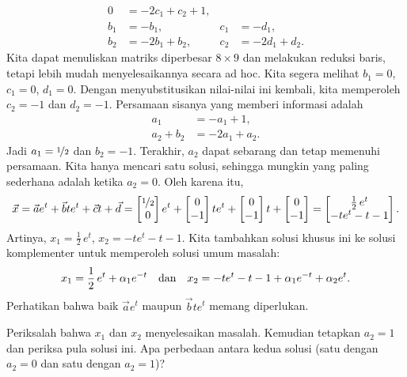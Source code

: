 \begin{example}
\begin{align*}
0 & = -2c_1+c_2 + 1 , \\
b_1 & = -b_1 , &
c_1 & = -d_1 , \\
b_2 & = -2b_1+b_2 , &
c_2 & = -2d_1+d_2 .
\end{align*}
Kita dapat menuliskan matriks diperbesar $8 \times 9$ dan melakukan
reduksi baris, tetapi lebih mudah menyelesaikannya secara ad hoc.
Kita segera melihat $b_1 = 0$, $c_1 = 0$, $d_1 = 0$.  Dengan menyubstitusikan
nilai-nilai ini
kembali, kita memperoleh $c_2 = -1$ dan $d_2 = -1$.  Persamaan sisanya
yang memberi informasi adalah
\begin{align*}
a_1 & = -a_1+1 , \\
a_2+b_2 & = -2a_1+a_2 .
\end{align*}
Jadi $a_1 = \nicefrac{1}{2}$ dan $b_2 = -1$.  Terakhir, $a_2$ dapat sebarang dan tetap memenuhi
persamaan.  Kita hanya mencari satu solusi, sehingga mungkin yang
paling sederhana
adalah ketika $a_2 = 0$.
Oleh karena itu,
\begin{equation*}
\vec{x} = 
\vec{a}
e^{t}
+
\vec{b}
t
e^{t}
+
\vec{c}
t +
\vec{d}
=
\begin{bmatrix}
\nicefrac{1}{2} \\ 0
\end{bmatrix}
e^t
+
\begin{bmatrix}
0 \\ -1
\end{bmatrix}
te^t
+
\begin{bmatrix}
0 \\ -1
\end{bmatrix}
t
+
\begin{bmatrix}
0 \\ -1
\end{bmatrix}
=
\begin{bmatrix}
\frac{1}{2}\,e^t \\
-te^t - t - 1
\end{bmatrix} .
\end{equation*}
Artinya, $x_1 = \frac{1}{2}\,e^t$,
$x_2 = -te^t - t - 1$.
Kita tambahkan solusi khusus ini ke solusi komplementer untuk memperoleh
solusi umum masalah:
\begin{equation*}
x_1 = \frac{1}{2}\,e^t + 
\alpha_1 e^{-t} \quad \text{dan} \quad
x_2 = -te^t - t - 1 + \alpha_1 e^{-t} + \alpha_2 e^{t}.
\avoidbreak
\end{equation*}
Perhatikan bahwa baik $\vec{a} e^t$
maupun $\vec{b} te^t$ memang diperlukan.
\end{example}

\begin{exercise}
Periksalah bahwa $x_1$ dan $x_2$ menyelesaikan masalah.  Kemudian tetapkan $a_2 = 1$
dan periksa pula solusi ini.  Apa perbedaan antara kedua
solusi (satu dengan $a_2=0$ dan satu dengan $a_2=1$)?
\end{exercise}

